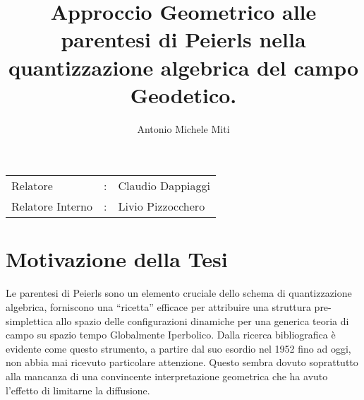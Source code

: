 \documentclass[11pt]{article}
\title{Approccio Geometrico alle parentesi di Peierls nella quantizzazione algebrica del campo Geodetico. }
\author{Antonio Michele Miti}
\date{}
\begin{document}
\maketitle

\begin{center}
\begin{tabular}{l c l}
Relatore & : & Claudio Dappiaggi \\
Relatore Interno & : & Livio Pizzocchero \\
\end{tabular}

\end{center}


\section{Motivazione della Tesi}



Le parentesi di Peierls sono un elemento cruciale dello schema di quantizzazione algebrica, forniscono una “ricetta” efficace per attribuire una struttura pre-simplettica allo spazio delle configurazioni dinamiche per una generica teoria di campo su spazio tempo Globalmente Iperbolico.
Dalla ricerca bibliografica è evidente come questo strumento, a partire dal suo esordio nel 1952 fino ad oggi, non abbia mai ricevuto particolare attenzione. Questo sembra dovuto soprattutto alla mancanza di una convincente interpretazione geometrica che ha avuto l'effetto di limitarne la diffusione.
\end{document}
